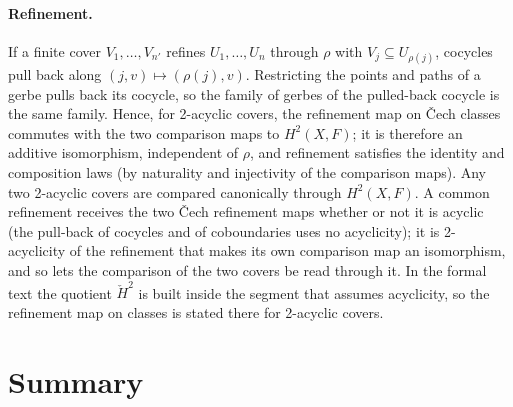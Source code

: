 \documentclass[11pt]{article}
\theoremstyle{remark}
\begin{document}
\paragraph{Refinement.} If a finite cover $V_1,\dots,V_{n'}$ refines
$U_1,\dots,U_n$ through $\rho$ with $V_j\subseteq U_{\rho(j)}$, cocycles
pull back along $(j,v)\mapsto(\rho(j),v)$. Restricting the points and
paths of a gerbe pulls back its cocycle, so the family of gerbes of the
pulled-back cocycle is the same family. Hence, for 2-acyclic covers, the
refinement map on \v{C}ech classes commutes with the two comparison maps
to $H^2(X,F)$; it is therefore an additive isomorphism, independent of
$\rho$, and refinement satisfies the identity and composition laws (by
naturality and injectivity of the comparison maps). Any two 2-acyclic
covers are compared canonically through $H^2(X,F)$. A common refinement
receives the two \v{C}ech refinement maps whether or not it is acyclic
(the pull-back of cocycles and of coboundaries uses no acyclicity); it is
2-acyclicity of the refinement that makes its own comparison map an
isomorphism, and so lets the comparison of the two covers be read through
it. In the formal text the quotient $\check H^2$ is built inside the
segment that assumes acyclicity, so the refinement map on classes is
stated there for 2-acyclic covers.

\section{Summary}
\end{document}
